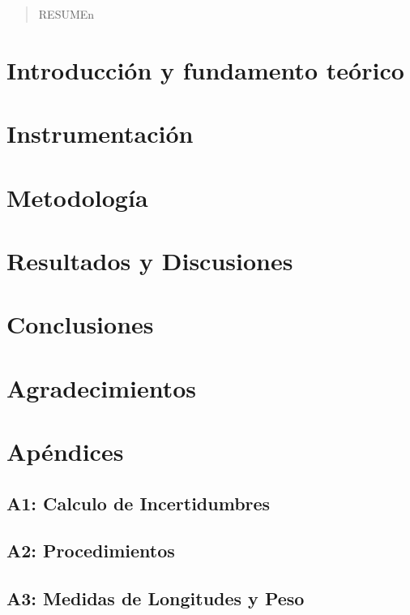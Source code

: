 \documentclass[10pt,onecolumn]{article}
\begin{document}

\tableofcontents %
\newpage

\HRule{0.5pt} %

\begin{abstract}
RESUMEn
\end{abstract}


\section{Introducción y fundamento teórico}

\section{Instrumentación}

\section{Metodología}


\section{Resultados y Discusiones}

\section{Conclusiones}

\section{Agradecimientos}

\section{Apéndices}
\subsection{A1: Calculo de Incertidumbres} 


\subsection{A2: Procedimientos}

\subsection{A3: Medidas de Longitudes y Peso }




\end{document}
